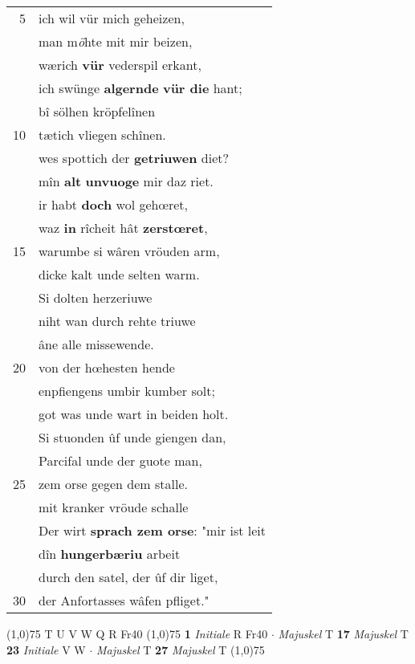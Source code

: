 \documentclass[8pt,a4paper,notitlepage]{article}
\begin{document}
\begin{table}[ht]
\begin{minipage}[t]{0.5\linewidth}
\begin{tabular}{rl}
5 & ich wil vür mich geheizen,\\ 
 & man m\textit{ö}hte mit mir beizen,\\ 
 & wærich \textbf{vür} vederspil erkant,\\ 
 & ich swünge \textbf{algernde} \textbf{vür die} hant;\\ 
 & bî sölhen kröpfelînen\\ 
10 & tætich vliegen schînen.\\ 
 & wes spottich der \textbf{getriuwen} diet?\\ 
 & mîn \textbf{alt} \textbf{unvuoge} mir daz riet.\\ 
 & ir habt \textbf{doch} wol gehœret,\\ 
 & waz \textbf{in} rîcheit hât \textbf{zerstœret},\\ 
15 & warumbe si wâren vröuden arm,\\ 
 & dicke kalt unde selten warm.\\ 
 & Si dolten herzeriuwe\\ 
 & niht wan durch rehte triuwe\\ 
 & âne alle missewende.\\ 
20 & von der hœhesten hende\\ 
 & enpfiengens umbir kumber solt;\\ 
 & got was unde wart in beiden holt.\\ 
 & Si stuonden ûf unde giengen dan,\\ 
 & Parcifal unde der guote man,\\ 
25 & zem orse gegen dem stalle.\\ 
 & mit kranker vröude schalle\\ 
 & Der wirt \textbf{sprach zem orse}: "mir ist leit\\ 
 & dîn \textbf{hungerbæriu} arbeit\\ 
 & durch den satel, der ûf dir liget,\\ 
30 & der Anfortasses wâfen pfliget."\\ 
\end{tabular}
\scriptsize
\line(1,0){75} \newline
T U V W Q R Fr40 \newline
\line(1,0){75} \newline
\textbf{1} \textit{Initiale} R Fr40   $\cdot$ \textit{Majuskel} T  \textbf{17} \textit{Majuskel} T  \textbf{23} \textit{Initiale} V W   $\cdot$ \textit{Majuskel} T  \textbf{27} \textit{Majuskel} T  \newline
\line(1,0){75} \newline

\end{minipage}
\end{table}
\end{document}
